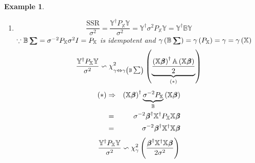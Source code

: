 \documentclass{article}
\newtheorem{example}[theorem]{Example}
\begin{document}
\begin{example}
\begin{enumerate}
\item 
\begin{equation*}
\frac{\text{SSR}}{\sigma ^{2}}=\frac{\mathbb{Y}^{\dagger }P_{\mathbb{X}}%
\mathbb{Y}}{\sigma ^{2}}=\mathbb{Y}^{\dagger }\sigma ^{2}P_{\mathbb{X}}%
\mathbb{Y=Y}^{\dagger }\mathbb{BY}
\end{equation*}%
$\because \mathbb{B}%
\tsum\mkern-20mu\tsum%
=\sigma ^{-2}P_{\mathbb{X}}\sigma ^{2}I=P_{\mathbb{X}}$ is idempotent and $%
\gamma \left( \mathbb{B}%
\tsum\mkern-20mu\tsum%
\right) =\gamma \left( P_{\mathbb{X}}\right) =\gamma =\gamma \left( \mathbb{X%
}\right) $%
\begin{equation*}
\therefore \frac{\mathbb{Y}^{\dagger }P_{\mathbb{X}}\mathbb{Y}}{\sigma ^{2}}%
\backsim \chi _{\gamma \Leftrightarrow \gamma \left( \mathbb{B}\tsum \right)
}^{2}\left( \underset{\left( \ast \right) }{\underbrace{\frac{\left( \mathbb{%
X}%
\beta\mkern-9.6mu \beta%
\right) ^{\dagger }\mathbb{A}\left( \mathbb{X}%
\beta\mkern-9.6mu \beta%
\right) }{2}}}\right) 
\end{equation*}%
\begin{eqnarray*}
\left( \ast \right)  &\Rightarrow &\left( \mathbb{X}%
\beta\mkern-9.6mu \beta%
\right) ^{\dagger }\underset{\mathbb{B}}{\underbrace{\sigma ^{-2}P_{\mathbb{X%
}}}}\left( \mathbb{X}%
\beta\mkern-9.6mu \beta%
\right)  \\
&=&\sigma ^{-2}%
\beta\mkern-9.6mu \beta%
^{\dagger }\mathbb{X}^{\dagger }P_{\mathbb{X}}\mathbb{X}%
\beta\mkern-9.6mu \beta
\\
&=&\sigma ^{-2}%
\beta\mkern-9.6mu \beta%
^{\dagger }\mathbb{X}^{\dagger }\mathbb{X}%
\beta\mkern-9.6mu \beta%
\end{eqnarray*}%
\begin{equation*}
\therefore \frac{\mathbb{Y}^{\dagger }P_{\mathbb{X}}\mathbb{Y}}{\sigma ^{2}}%
\backsim \chi _{\gamma }^{2}\left( \frac{%
\beta\mkern-9.6mu \beta%
^{\dagger }\mathbb{X}^{\dagger }\mathbb{X}%
\beta\mkern-9.6mu \beta%
}{2\sigma ^{2}}\right) 
\end{equation*}
\end{enumerate}
\end{example}
\end{document}
